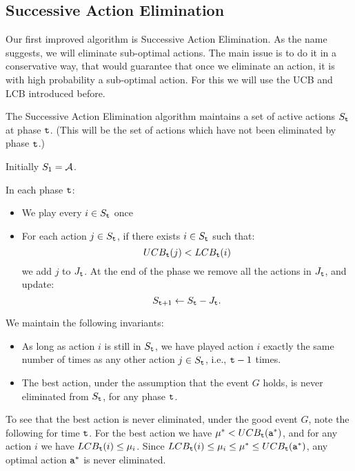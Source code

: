 \subsection{Successive Action Elimination}


Our first improved algorithm is Successive Action Elimination. As the name suggests, we will eliminate sub-optimal actions. The main issue is to do it in a conservative way, that would guarantee that once we eliminate an action, it is with high probability a sub-optimal action. For this we will use the UCB and LCB introduced before.

The Successive Action Elimination algorithm maintains a set of active actions $S_{\tt t}$ at phase ${\tt t}$. (This will be the set of actions which have not been eliminated by phase ${\tt t}$.)

Initially $S_1=\mathcal{A}$.

In each phase ${\tt t}$:
\begin{itemize}
\item We play every $i\in S_{\tt t}$ once
\item For each action $j\in S_{\tt t}$, if there exists $i\in S_{\tt t}$ such that:
\[
UCB_{{\tt t}}(j)<LCB_{{\tt t}}(i)
\]
we add $j$ to $J_{\tt t}$.
At the end of the phase we remove all the actions in $J_{\tt t}$, and update:
\[
S_{{\tt t}+1}\leftarrow S_{\tt t}-J_{\tt t}.
\]
\end{itemize}


We maintain the following invariants:
\begin{itemize}
\item As long as action $i$ is still in $S_{\tt t}$, we have played action $i$ exactly the
same number of times as any other action $j\in S_{\tt t}$, i.e., ${\tt t}-1$ times.
\item The best action, under the assumption that the event $G$ holds, is never eliminated
from $S_{\tt t}$, for any phase ${\tt t}$.
\end{itemize}
To see that the best action is never eliminated, under the good event $G$, note the following for time ${\tt t}$. For the best action we have $\mu^*< UCB_{{\tt t}}({\tt a}^*)$, and for any action $i$ we have $LCB_{\tt t}(i)\leq \mu_i$. Since $LCB_{\tt t}(i)\leq \mu_i\leq \mu^*\leq UCB_{\tt t}({\tt a}^*)$, any optimal action ${\tt a}^*$ is never eliminated.

